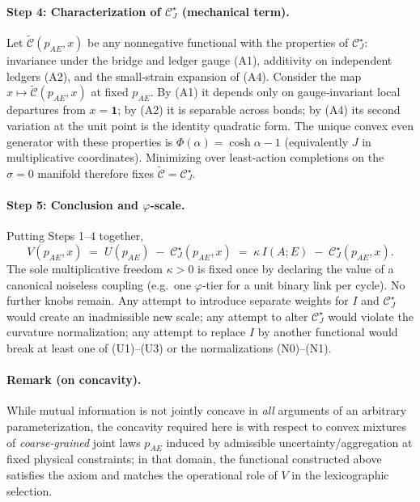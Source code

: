 \documentclass[11pt]{article}
\begin{document}
\paragraph{Step 4: Characterization of $\mathcal{C}_J^\star$ (mechanical term).}
Let $\widetilde{\mathcal{C}}(p_{AE},x)$ be any nonnegative functional with the properties of $\mathcal{C}_J^\star$: invariance under the bridge and ledger gauge (A1), additivity on independent ledgers (A2), and the small‑strain expansion of (A4). Consider the map $x\mapsto \widetilde{\mathcal{C}}(p_{AE},x)$ at fixed $p_{AE}$. By (A1) it depends only on gauge‑invariant local departures from $x=\mathbf 1$; by (A2) it is separable across bonds; by (A4) its second variation at the unit point is the identity quadratic form. The unique convex even generator with these properties is $\Phi(\alpha)=\cosh\alpha-1$ (equivalently $J$ in multiplicative coordinates). Minimizing over least‑action completions on the $\sigma=0$ manifold therefore fixes $\widetilde{\mathcal{C}}=\mathcal{C}_J^\star$.

\paragraph{Step 5: Conclusion and $\varphi$‑scale.}
Putting Steps 1–4 together,
\[
V(p_{AE},x)\;=\;U(p_{AE})\;-\;\mathcal{C}_J^\star(p_{AE},x)
\;=\;\kappa\, I(A;E)\;-\;\mathcal{C}_J^\star(p_{AE},x).
\]
The sole multiplicative freedom $\kappa>0$ is fixed once by declaring the value of a canonical noiseless coupling (e.g.\ one $\varphi$‑tier for a unit binary link per cycle). No further knobs remain. Any attempt to introduce separate weights for $I$ and $\mathcal{C}_J^\star$ would create an inadmissible new scale; any attempt to alter $\mathcal{C}_J^\star$ would violate the curvature normalization; any attempt to replace $I$ by another functional would break at least one of (U1)–(U3) or the normalizations (N0)–(N1).

\paragraph{Remark (on concavity).}
While mutual information is not jointly concave in \emph{all} arguments of an arbitrary parameterization, the concavity required here is with respect to convex mixtures of \emph{coarse‑grained} joint laws $p_{AE}$ induced by admissible uncertainty/aggregation at fixed physical constraints; in that domain, the functional constructed above satisfies the axiom and matches the operational role of $V$ in the lexicographic selection.
\end{document}
